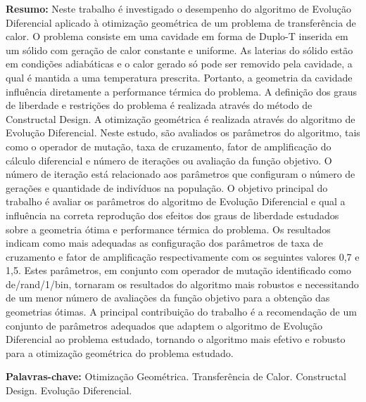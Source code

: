 \documentclass[12pt,A4,A4pt]{article}
\begin{document}
\begin{flushleft}
{\small {} \justify
\textbf{Resumo:} Neste trabalho é investigado o desempenho do algoritmo de Evolução Diferencial aplicado à otimização geométrica de um problema de transferência de calor. O problema consiste em uma cavidade em forma de Duplo-T inserida em um sólido com geração de calor constante e uniforme. As laterias do sólido estão em condições adiabáticas e o calor gerado só pode ser removido pela cavidade, a qual é mantida a uma temperatura prescrita. Portanto, a geometria da cavidade influência diretamente a performance térmica do problema. A definição dos graus de liberdade e restrições do problema é realizada através do método de Constructal Design. A otimização geométrica é realizada através do algoritmo de Evolução Diferencial. Neste estudo, são avaliados os parâmetros do algoritmo, tais como o operador de mutação, taxa de cruzamento, fator de amplificação do cálculo diferencial e número de iterações ou avaliação da função objetivo. O número de iteração está relacionado aos parâmetros que configuram o número de gerações e quantidade de indivíduos na população.  O objetivo principal do trabalho é avaliar os parâmetros do algoritmo de Evolução Diferencial e qual a influência na correta reprodução dos efeitos dos graus de liberdade estudados sobre a geometria ótima e performance térmica do problema. Os resultados indicam como mais adequadas as configuração dos parâmetros de taxa de cruzamento e fator de amplificação respectivamente com os seguintes valores 0,7 e 1,5. Estes parâmetros, em conjunto com operador de mutação identificado como de/rand/1/bin, tornaram os resultados do algoritmo mais robustos e necessitando de um menor número de avaliações da função objetivo para a obtenção das geometrias ótimas. A principal contribuição do trabalho é a recomendação de um conjunto de parâmetros adequados que adaptem o algoritmo de Evolução Diferencial ao problema estudado, tornando o algoritmo mais efetivo e robusto para a otimização geométrica do problema estudado.

\vspace{0.3cm}

\noindent\textbf{Palavras-chave:} Otimização Geométrica. Transferência de Calor. Constructal Design. Evolução Diferencial.}
\end{flushleft}


\end{document}
